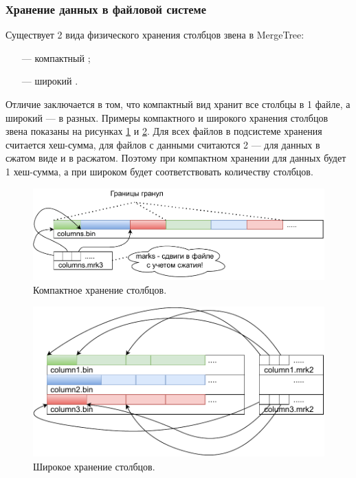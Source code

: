 \subsubsection{Хранение данных в файловой системе}

Существует 2 вида физического хранения столбцов звена в MergeTree:
\begin{itemize}
    \item [---] компактный \cite{datapartcompact};
    \item [---] широкий \cite{datapartwide}.
\end{itemize}

Отличие заключается в том, что компактный вид хранит все столбцы в 1 файле, а широкий --- в разных. Примеры компактного и широкого хранения столбцов звена показаны на рисунках \ref{fig:compactstore} и \ref{fig:widestore}. Для всех файлов в подсистеме хранения считается хеш-сумма, для файлов с данными считаются 2 --- для данных в сжатом виде и в расжатом. Поэтому при компактном хранении для данных будет 1 хеш-сумма, а при широком будет соответствовать количеству столбцов.

\begin{figure}[hbtp]
	\centering
	\includegraphics[width=\textwidth]{img/compactstore.pdf}
	\caption{Компактное хранение столбцов.}
	\label{fig:compactstore}
\end{figure}

\begin{figure}[hbtp]
	\centering
	\includegraphics[width=\textwidth]{img/widestore.pdf}
	\caption{Широкое хранение столбцов.}
	\label{fig:widestore}
\end{figure}

